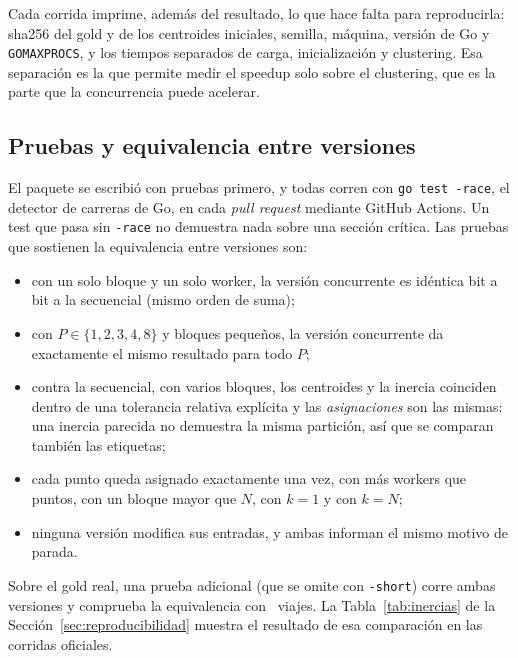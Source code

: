 Cada corrida imprime, además del resultado, lo que hace falta para reproducirla: sha256 del gold y
de los centroides iniciales, semilla, máquina, versión de Go y \texttt{GOMAXPROCS}, y los tiempos
separados de carga, inicialización y clustering. Esa separación es la que permite medir el speedup
solo sobre el clustering, que es la parte que la concurrencia puede acelerar.

\subsection{Pruebas y equivalencia entre versiones}\label{sec:equivalencia}

El paquete se escribió con pruebas primero, y todas corren con \texttt{go test -race}, el detector
de carreras de Go, en cada \emph{pull request} mediante GitHub Actions. Un test que pasa sin
\texttt{-race} no demuestra nada sobre una sección crítica. Las pruebas que sostienen la
equivalencia entre versiones son:

\begin{itemize}
  \item con un solo bloque y un solo worker, la versión concurrente es idéntica bit a bit a la
        secuencial (mismo orden de suma);
  \item con $P \in \{1, 2, 3, 4, 8\}$ y bloques pequeños, la versión concurrente da exactamente el
        mismo resultado para todo $P$;
  \item contra la secuencial, con varios bloques, los centroides y la inercia coinciden dentro de una
        tolerancia relativa explícita y las \emph{asignaciones} son las mismas: una inercia parecida
        no demuestra la misma partición, así que se comparan también las etiquetas;
  \item cada punto queda asignado exactamente una vez, con más workers que puntos, con un bloque
        mayor que $N$, con $k = 1$ y con $k = N$;
  \item ninguna versión modifica sus entradas, y ambas informan el mismo motivo de parada.
\end{itemize}

Sobre el gold real, una prueba adicional (que se omite con \texttt{-short}) corre ambas versiones y
comprueba la equivalencia con ~viajes. La Tabla~\ref{tab:inercias} de la
Sección~\ref{sec:reproducibilidad} muestra el resultado de esa comparación en las corridas oficiales.
